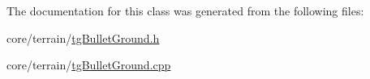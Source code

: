 The documentation for this class was generated from the following files\-:\begin{DoxyCompactItemize}
\item 
core/terrain/\hyperlink{tg_bullet_ground_8h}{tg\-Bullet\-Ground.\-h}\item 
core/terrain/\hyperlink{tg_bullet_ground_8cpp}{tg\-Bullet\-Ground.\-cpp}\end{DoxyCompactItemize}
